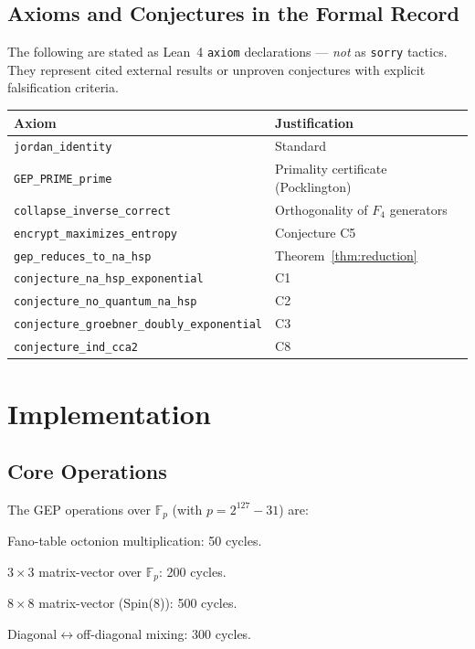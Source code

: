 \documentclass[11pt,letterpaper]{article}
\theoremstyle{definition}
\begin{document}
\subsection{Axioms and Conjectures in the Formal Record}

The following are stated as Lean~4 \texttt{axiom} declarations — \emph{not}
as \texttt{sorry} tactics. They represent cited external results or unproven
conjectures with explicit falsification criteria.

\begin{center}
\begin{tabular}{ll}
\toprule
Axiom & Justification \\
\midrule
\texttt{jordan\_identity} & Standard~\cite{mccrimmon2004} \\
\texttt{GEP\_PRIME\_prime} & Primality certificate (Pocklington) \\
\texttt{collapse\_inverse\_correct} & Orthogonality of $F_4$ generators \\
\texttt{encrypt\_maximizes\_entropy} & Conjecture C5 \\
\texttt{gep\_reduces\_to\_na\_hsp} & Theorem~\ref{thm:reduction} \\
\texttt{conjecture\_na\_hsp\_exponential} & C1 \\
\texttt{conjecture\_no\_quantum\_na\_hsp} & C2 \\
\texttt{conjecture\_groebner\_doubly\_exponential} & C3 \\
\texttt{conjecture\_ind\_cca2} & C8 \\
\bottomrule
\end{tabular}
\end{center}

\section{Implementation}
\label{sec:implementation}

\subsection{Core Operations}

The GEP operations over $\mathbb{F}_p$ (with $p = 2^{127} - 31$) are:

\begin{description}[nosep]
\item[\texttt{fp\_oct\_mul}] Fano-table octonion multiplication: 50 cycles.
\item[\texttt{fp\_so3\_apply}] $3 \times 3$ matrix-vector over $\mathbb{F}_p$: 200 cycles.
\item[\texttt{fp\_spin8\_apply}] $8 \times 8$ matrix-vector (Spin(8)): 500 cycles.
\item[\texttt{fp\_exceptional}] Diagonal$\leftrightarrow$off-diagonal mixing: 300 cycles.
\end{description}
\end{document}
